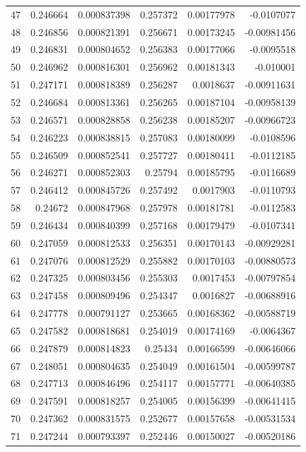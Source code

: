 \documentclass[10pt]{article}
\begin{document}
\begin{longtable}{rrrrrr}
47 & 0.246664 & 0.000837398 & 0.257372 & 0.00177978 & -0.0107077 \\
48 & 0.246856 & 0.000821391 & 0.256671 & 0.00173245 & -0.00981456 \\
49 & 0.246831 & 0.000804652 & 0.256383 & 0.00177066 & -0.0095518 \\
50 & 0.246962 & 0.000816301 & 0.256962 & 0.00181343 & -0.010001 \\
51 & 0.247171 & 0.000818389 & 0.256287 & 0.0018637 & -0.00911631 \\
52 & 0.246684 & 0.000813361 & 0.256265 & 0.00187104 & -0.00958139 \\
53 & 0.246571 & 0.000828858 & 0.256238 & 0.00185207 & -0.00966723 \\
54 & 0.246223 & 0.000838815 & 0.257083 & 0.00180099 & -0.0108596 \\
55 & 0.246509 & 0.000852541 & 0.257727 & 0.00180411 & -0.0112185 \\
56 & 0.246271 & 0.000852303 & 0.25794 & 0.00185795 & -0.0116689 \\
57 & 0.246412 & 0.000845726 & 0.257492 & 0.0017903 & -0.0110793 \\
58 & 0.24672 & 0.000847968 & 0.257978 & 0.00181781 & -0.0112583 \\
59 & 0.246434 & 0.000840399 & 0.257168 & 0.00179479 & -0.0107341 \\
60 & 0.247059 & 0.000812533 & 0.256351 & 0.00170143 & -0.00929281 \\
61 & 0.247076 & 0.000812529 & 0.255882 & 0.00170103 & -0.00880573 \\
62 & 0.247325 & 0.000803456 & 0.255303 & 0.0017453 & -0.00797854 \\
63 & 0.247458 & 0.000809496 & 0.254347 & 0.0016827 & -0.00688916 \\
64 & 0.247778 & 0.000791127 & 0.253665 & 0.00168362 & -0.00588719 \\
65 & 0.247582 & 0.000818681 & 0.254019 & 0.00174169 & -0.0064367 \\
66 & 0.247879 & 0.000814823 & 0.25434 & 0.00166599 & -0.00646066 \\
67 & 0.248051 & 0.000804635 & 0.254049 & 0.00161504 & -0.00599787 \\
68 & 0.247713 & 0.000846496 & 0.254117 & 0.00157771 & -0.00640385 \\
69 & 0.247591 & 0.000818257 & 0.254005 & 0.00156399 & -0.00641415 \\
70 & 0.247362 & 0.000831575 & 0.252677 & 0.00157658 & -0.00531534 \\
71 & 0.247244 & 0.000793397 & 0.252446 & 0.00150027 & -0.00520186 \\

\end{longtable}
\end{document}
